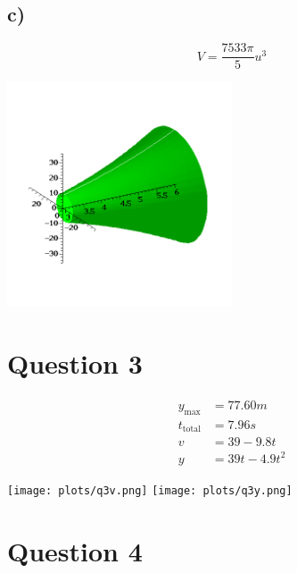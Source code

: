 \documentclass[12pt]{article}
\begin{document}
\subsection*{c)}
\[
    V = \frac{7533 \pi}{5} u^3
\]
\begin{center}\includegraphics[width=0.5\textwidth, trim={2cm 1cm 2cm 3cm},clip]{plots/q2c.png}\end{center}

\newpage
\section*{Question 3}
\begin{align*}
    y_{\text{max}} &= 77.60 m \\
    t_{\text{total}} &= 7.96 s \\
    v &= 39 - 9.8t \\
    y &= 39t -4.9t^2
\end{align*}

\begin{multicols}{2}
    \texttt{[image: plots/q3v.png]}
    \texttt{[image: plots/q3y.png]}
\end{multicols}

\section*{Question 4}
\end{document}
